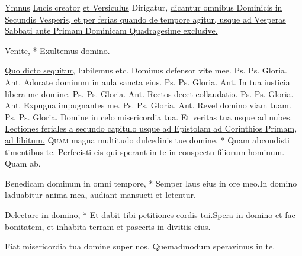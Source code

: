 \begin{multicols*}{2}
\newline \ul{Ymnus} \hyperlink{lucis-creator}{Lucis creator} \ul{et Versiculus} Dirigatur, \ul{dicantur omnibus Dominicis in Secundis Vesperis, et per ferias quando de tempore agitur, usque ad Vesperas Sabbati ante Primam Dominicam Quadragesime exclusive.}
{\color{Red} }
\par {}
\begin{invitatory}
{Venite, * Exultemus domino.}
\end{invitatory}
\newline \ul{Quo dicto sequitur,} Iubilemus etc.
 Dominus defensor vite mee. {\color{Red} Ps.}  {\color{Red} Ps.}  Gloria. {\color{Red} Ant.} Adorate dominum in aula sancta eius. {\color{Red} Ps.}  {\color{Red} Ps.}  Gloria. {\color{Red} Ant.} In tua iusticia libera me domine. {\color{Red} Ps.}  {\color{Red} Ps.}  Gloria. {\color{Red} Ant.} Rectos decet collaudatio. {\color{Red} Ps.}  {\color{Red} Ps.}  Gloria. {\color{Red} Ant.} Expugna impugnantes me. {\color{Red} Ps.}  {\color{Red} Ps.}  Gloria. {\color{Red} Ant.} Revel domino viam tuam. {\color{Red} Ps.}  {\color{Red} Ps.}  Gloria. \V Domine in celo misericordia tua. \R Et veritas tua usque ad nubes.
\newline \ul{Lectiones feriales a secundo capitulo usque ad Epistolam ad Corinthios Primam, ad libitum.} \R
\lettrine[lines=2]{\zallmancaps \color{Red} Q}{uam} \hypertarget{quam-magna}{\label{quam-magna}} magna multitudo dulcedinis tue domine, * Quam abcondisti timentibus te. \V Perfecisti eis qui sperant in te in conspectu filiorum hominum. Quam ab.
\begin{responsory}
{Benedicam dominum in omni tempore, * Semper laus eius in ore meo.}{In domino laduabitur anima mea, audiant mansueti et letentur.}
\end{responsory}
\begin{responsory-doxology}
{Delectare in domino, * Et dabit tibi petitiones cordis tui.}{Spera in domino et fac bonitatem, et inhabita terram et pasceris in divitiis eius.}
\end{responsory-doxology}
\newline \V Fiat misericordia tua domine super nos.
\newline \R Quemadmodum speravimus in te.

\end{multicols*}
